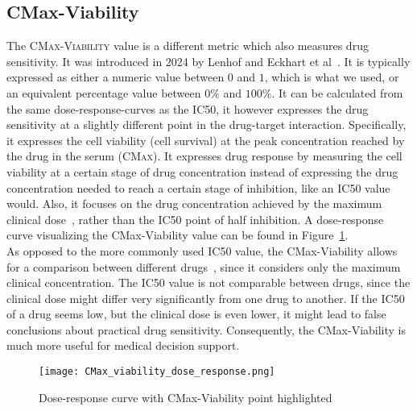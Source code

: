 \subsection{CMax-Viability}\label{subsec:ds_cmax}
The \textsc{CMax-Viability} value is a different metric which also measures drug sensitivity. It was introduced in 2024 by Lenhof and Eckhart et al~\cite{cmax_viability}. It is typically expressed as either a numeric value between $0$ and $1$, which is what we used, or an equivalent percentage value between $0\%$ and $100\%$. It can be calculated from the same dose-response-curves as the \textsc{IC50}, it however expresses the drug sensitivity at a slightly different point in the drug-target interaction. Specifically, it expresses the cell viability (cell survival) at the peak concentration reached by the drug in the serum (\textsc{CMax}).
It expresses drug response by measuring the cell viability at a certain stage of drug concentration instead of expressing the drug concentration needed to reach a certain stage of inhibition, like an IC50 value would.
Also, it focuses on the drug concentration achieved by the maximum clinical dose~\cite{goodman_pharmacological_basis}, rather than the IC50 point of half inhibition.
A dose-response curve visualizing the CMax-Viability value can be found in Figure~\ref{fig:cmax}.\\
As opposed to the more commonly used IC50 value, the CMax-Viability allows for a comparison between different drugs~\cite{cmax_viability}, since it considers only the maximum clinical concentration. The IC50 value is not comparable between drugs, since the clinical dose might differ very significantly from one drug to another. If the IC50 of a drug seems low, but the clinical dose is even lower, it might lead to false conclusions about practical drug sensitivity. Consequently, the CMax-Viability is much more useful for medical decision support.
\begin{figure}
	\centering
	\texttt{[image: CMax\_viability\_dose\_response.png]}
	\caption{Dose-response curve with CMax-Viability point highlighted}
	\label{fig:cmax}
\end{figure}
